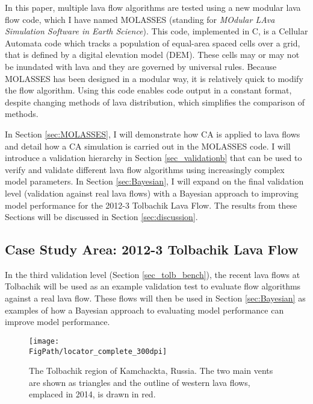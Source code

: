 	In this paper, multiple lava flow algorithms are tested using a new modular lava flow code, which I have named MOLASSES (standing for \textit{MOdular LAva Simulation Software in Earth Science}). This code, implemented in C, is a Cellular Automata code which tracks a population of equal-area spaced cells over a grid, that is defined by a digital elevation model (DEM). These cells may or may not be inundated with lava and they are governed by universal rules. Because MOLASSES has been designed in a modular way, it is relatively quick to modify the flow algorithm. Using this code enables code output in a constant format, despite changing methods of lava distribution, which simplifies the comparison of methods.
	
	In Section \ref{sec:MOLASSES}, I will demonstrate how CA is applied to lava flows and detail how a CA simulation is carried out in the MOLASSES code. I will introduce a validation hierarchy in Section \ref{sec_validationb} that can be used to verify and validate different lava flow algorithms using increasingly complex model parameters. In Section \ref{sec:Bayesian}, I will expand on the final validation level (validation against real lava flows) with a Bayesian approach to improving model performance for the 2012-3 Tolbachik Lava Flow. The results from these Sections will be discussed in Section \ref{sec:discussion}.
	
	\subsection{Case Study Area: 2012-3 Tolbachik Lava Flow}\label{sec_tolb_back}
	In the third validation level (Section \ref{sec_tolb_bench}), the recent lava flows at Tolbachik will be used as an example validation test to evaluate flow algorithms against a real lava flow. These flows will then be used in Section \ref{sec:Bayesian} as examples of how a Bayesian approach to evaluating model performance can improve model performance. 
	
\begin{figure}[!h]
	\centering
	\texttt{[image: \\FigPath/locator\_complete\_300dpi]}
	\caption[The Tolbachik region of Kamchackta, Russia]{The Tolbachik region of Kamchackta, Russia. The two main vents are shown as triangles and the outline of western lava flows, emplaced in 2014, is drawn in red.}
	\label{fig_locator}
\end{figure}
	

